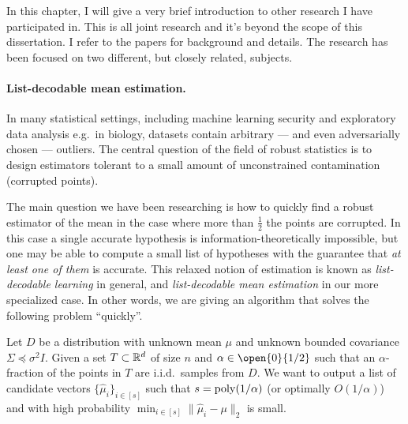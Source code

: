 
In this chapter, I will give a very brief introduction to other research I have participated in. This is all joint research and it's beyond the scope of this dissertation. I refer to the papers \cite{robstat1,robstat2,robstat3} for background and details. The research has been focused on two different, but closely related, subjects.

\paragraph{List-decodable mean estimation.}
In many statistical settings, including machine learning security and exploratory data analysis e.g.\ in biology,
datasets contain arbitrary --- and even adversarially chosen --- outliers.
The central question of the field of robust statistics is to design estimators tolerant to a small amount of unconstrained contamination (corrupted points).

The main question we have been researching is how to quickly find a robust estimator of the mean in the case where more than $\frac{1}{2}$ the points are corrupted. In this case a single accurate hypothesis is information-theoretically impossible, but one may be able to compute a small list of hypotheses with the guarantee that \emph{at least one of them} is accurate. This relaxed notion of estimation is known as \emph{list-decodable learning} in general, and \emph{list-decodable mean estimation} in our more specialized case. In other words, we are giving an algorithm that solves the following problem ``quickly''.

Let $D$ be a distribution with unknown mean $\mu$ and unknown bounded covariance $\Sigma \preceq \sigma^2 I$. Given a set $T \subset \mathbb{R}^d$ of size $n$ and $\alpha \in \open{0}{1/2}$ such that an $\alpha$-fraction of the points in $T$ are i.i.d.\ samples from $D$. We want to output a list of candidate vectors $\{\widehat{\mu}_i \}_{i \in [s]}$ such that $s = \operatorname{poly}(1/\alpha)$ (or optimally $O(1/\alpha)$) and with high probability $\min_{i \in [s]} \|\widehat{\mu}_i - \mu \|_2$ is small.

